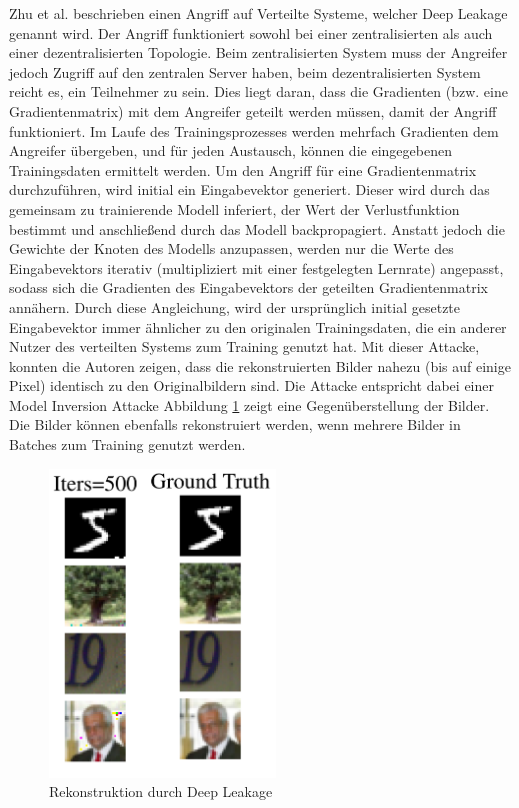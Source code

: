 Zhu et al. \cite{P-18} beschrieben einen Angriff auf Verteilte Systeme, welcher Deep Leakage genannt wird.
Der Angriff funktioniert sowohl bei einer zentralisierten als auch einer dezentralisierten Topologie. 
Beim zentralisierten System muss der Angreifer jedoch Zugriff auf den zentralen Server haben, beim dezentralisierten System reicht es, ein Teilnehmer zu sein.
Dies liegt daran, dass die Gradienten (bzw. eine Gradientenmatrix) mit dem Angreifer geteilt werden müssen, damit der Angriff funktioniert.
Im Laufe des Trainingsprozesses werden mehrfach Gradienten dem Angreifer übergeben, und für jeden Austausch, können die eingegebenen Trainingsdaten ermittelt werden.
Um den Angriff für eine Gradientenmatrix durchzuführen, wird initial ein Eingabevektor generiert.
Dieser wird durch das gemeinsam zu trainierende Modell inferiert, der Wert der Verlustfunktion bestimmt und anschließend durch das Modell backpropagiert.
Anstatt jedoch die Gewichte der Knoten des Modells anzupassen, werden nur die Werte des Eingabevektors iterativ (multipliziert mit einer festgelegten Lernrate) angepasst, sodass sich die Gradienten des Eingabevektors der geteilten Gradientenmatrix annähern.
Durch diese Angleichung, wird der ursprünglich initial gesetzte Eingabevektor immer ähnlicher zu den originalen Trainingsdaten, die ein anderer Nutzer des verteilten Systems zum Training genutzt hat.
Mit dieser Attacke, konnten die Autoren zeigen, dass die rekonstruierten Bilder nahezu (bis auf einige Pixel) identisch zu den Originalbildern sind. 
Die Attacke entspricht dabei einer Model Inversion Attacke
Abbildung \ref{fig:deep_leakage} zeigt eine Gegenüberstellung der Bilder.
Die Bilder können ebenfalls rekonstruiert werden, wenn mehrere Bilder in Batches zum Training genutzt werden.

\begin{figure}[!htb]
    \centering
    \includegraphics[width=6cm]{figures/deep_leakage}
    \caption{Rekonstruktion durch Deep Leakage \cite{P-18}}
    \label{fig:deep_leakage}
\end{figure} 

